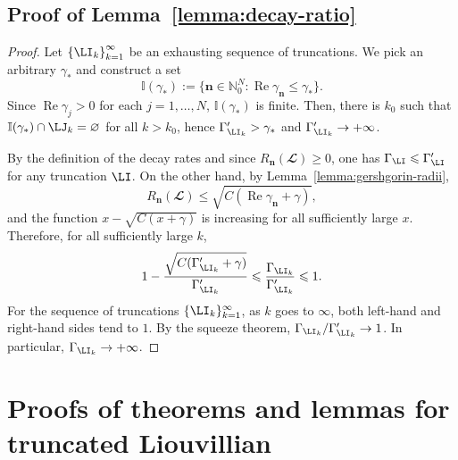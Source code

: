 \documentclass{SciPost}
\renewcommand{\Re}{\operatorname{Re}}
\begin{document}
\subsection{Proof of Lemma~\ref{lemma:decay-ratio}}
\label{sec:lemma-decay-ratio-proof}
\begin{proof}
    Let $\left\{\LI_k\right\}_{k=1}^\infty$ be an exhausting sequence of truncations. We pick an arbitrary $\gamma_\ast$ and construct a set 
    \begin{equation}
        \mathbb I(\gamma_\ast) := \{\bm n \in \mathbb N_0^N : \Re \gamma_{\bm n} \leq \gamma_\ast\}.
    \end{equation}
    Since $\Re \gamma_j > 0$ for each $j = 1, \ldots, N$, $\mathbb I(\gamma_\ast)$ is finite. Then, there is $k_0$ such that $\mathbb I(\gamma_\ast) \cap \LJ_k = \varnothing$ for all $k > k_0$, hence $\Gamma'_{\LI_k} > \gamma_\ast$ and $\Gamma'_{\LI_k} \to +\infty$.

    By the definition of the decay rates and since \(R_{\bm n}(\mathbfcal L) \geqslant 0\), one has
    $\Gamma_{\LI} \leqslant \Gamma'_{\LI}$ for any truncation $\LI$. On the other hand, by Lemma~\ref{lemma:gershgorin-radii},
    \begin{equation}
        R_{\bm n}(\mathbfcal L)
        \leqslant
        \sqrt{C(\Re \gamma_{\bm n}+\gamma)},
    \end{equation}
    and the function $x-\sqrt{C(x+\gamma)}$ is increasing for all sufficiently large $x$. Therefore, for all sufficiently large $k$,
    \begin{equation}
        1
        -
        \frac{\sqrt{C(\Gamma'_{\LI_k}+\gamma)}}{\Gamma'_{\LI_k}}
        \leqslant
        \frac{\Gamma_{\LI_k}}{\Gamma'_{\LI_k}}
        \leqslant
        1.
    \end{equation}
    For the sequence of truncations $\{\LI_k\}_{k=1}^\infty$, as $k$ goes to $\infty$, both left-hand and right-hand sides tend to \(1\). By the squeeze theorem,
    ${\Gamma_{\LI_k}}/{\Gamma'_{\LI_k}} \to 1$. In particular, $\Gamma_{\LI_k} \to +\infty$.
\end{proof}

\section{Proofs of theorems and lemmas for truncated Liouvillian}
\end{document}
